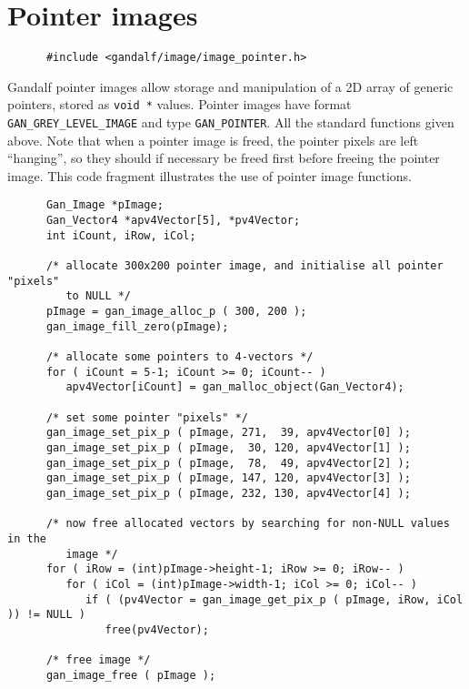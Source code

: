 \section{Pointer images} \label{pointer-image-sec}
\begin{verbatim}
      #include <gandalf/image/image_pointer.h>
\end{verbatim}
Gandalf pointer images allow storage and manipulation of a 2D array of
generic pointers, stored as {\tt void *} values. Pointer images have
format {\tt GAN\_GREY\_LEVEL\_IMAGE} and type {\tt GAN\_POINTER}.
All the standard functions given above. Note that when a pointer image
is freed, the pointer pixels are left ``hanging'', so they should
if necessary be freed first before freeing the pointer image.
This code fragment illustrates the use of pointer image functions.
\begin{verbatim}
      Gan_Image *pImage;
      Gan_Vector4 *apv4Vector[5], *pv4Vector;
      int iCount, iRow, iCol;

      /* allocate 300x200 pointer image, and initialise all pointer "pixels"
         to NULL */
      pImage = gan_image_alloc_p ( 300, 200 );
      gan_image_fill_zero(pImage);

      /* allocate some pointers to 4-vectors */
      for ( iCount = 5-1; iCount >= 0; iCount-- )
         apv4Vector[iCount] = gan_malloc_object(Gan_Vector4);

      /* set some pointer "pixels" */
      gan_image_set_pix_p ( pImage, 271,  39, apv4Vector[0] );
      gan_image_set_pix_p ( pImage,  30, 120, apv4Vector[1] );
      gan_image_set_pix_p ( pImage,  78,  49, apv4Vector[2] );
      gan_image_set_pix_p ( pImage, 147, 120, apv4Vector[3] );
      gan_image_set_pix_p ( pImage, 232, 130, apv4Vector[4] );

      /* now free allocated vectors by searching for non-NULL values in the
         image */
      for ( iRow = (int)pImage->height-1; iRow >= 0; iRow-- )
         for ( iCol = (int)pImage->width-1; iCol >= 0; iCol-- )
            if ( (pv4Vector = gan_image_get_pix_p ( pImage, iRow, iCol )) != NULL )
               free(pv4Vector);

      /* free image */
      gan_image_free ( pImage );
\end{verbatim}

